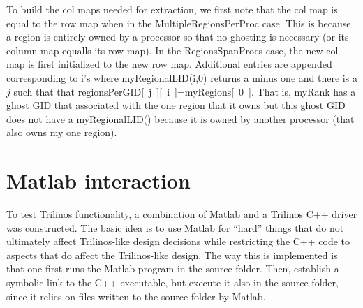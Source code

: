 \documentclass[11pt]{article}
\newcommand{\REMOVE}[1]{}
\begin{document}
\REMOVE{
For some reason,
I wrote a clever version of this for the {\sf RegionsSpanProcs} case.
This code builds a vector corresponding to composite col map with all -1's.

It
additionally adds any GID that is in col map but not in row map
    \begin{enumerate}
    \item  look at remaining -1's and change them to +1 if they
           correspond to a point with multiple regions (that includes my region)
           as this region interface must be included in my new row map.
    \end{enumerate}
    That is, a point is not a region interface if not associated with multiple
    regions. If this point is also a ghost GID, then it must not be interior
    to a region that {\sf myRank} owns. Thus, this GID does not need to be
    included in {\sf myRank}'s new row map. Further, there is a chance that
    some region interface GIDs among {\sf myRank}'s ghost GIDs are not actually
    associated with {\sf myRank}'s regions as
           ghost GIDs might extend into a neighboring region.
\end{quote}
\indent $\bullet$ {\sf MultipleRegionsPerProc}
\begin{quote}
    b) case 2: regions do not cross procs but a proc owns more than one region
         - compute the maximum # of regions that any proc has
         - set numRounds = maxNumRegPerProc
         - for i=1:numRounds
              curRegion = lowestRegOwnedByProc
              rowMap(round) = anyone in my compositeColMap that belongs to curRegion
           end
\end{quote}
}

To build the col maps needed for extraction, we first note that
the col map is equal to the row map when in the {\sf MultipleRegionsPerProc}
case. This is because a region is entirely owned by a processor so that
no ghosting is necessary (or its column map equalls its row map). In the
{\sf RegionsSpanProcs} case, the new col map is first initialized to the
new row map. Additional entries are appended corresponding to
i's where {\sf myRegionalLID(i,0)} returns a minus one and there is a $j$ such that
that {\sf regionsPerGID[~j~][~i~]=myRegions[~0~]}. That is, {\sf myRank}
has a ghost GID that associated with the one region that it owns but
this ghost GID does not have a {\sf myRegionalLID()} because it is owned
by another processor (that also owns my one region).

\section{Matlab interaction}
To test Trilinos functionality, a combination of Matlab and a Trilinos
C++ driver was constructed. The basic idea is to use Matlab for ``hard''
things that do not ultimately affect Trilinos-like design decisions while
restricting the C++ code to aspects that do affect the Trilinos-like design.
The way this is implemented is that one first runs the Matlab program in the source folder.
Then, establish a symbolic link to the C++ executable, but execute it also in the source
folder, since it relies on files written to the source folder by Matlab.
\end{document}
